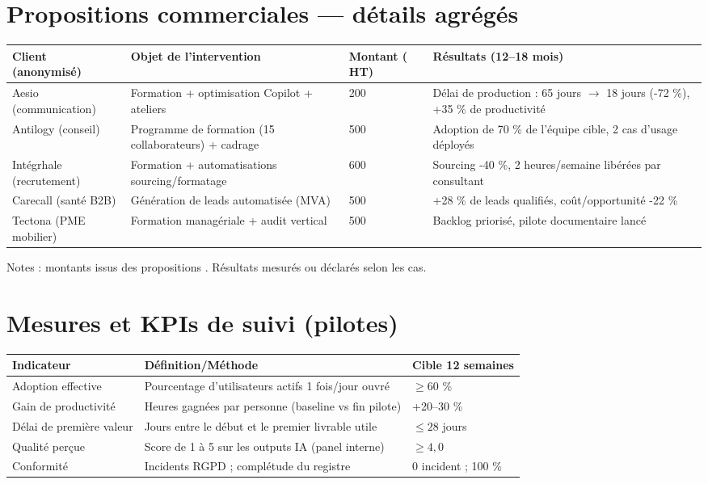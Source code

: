 \section{Propositions commerciales — détails agrégés}
\begin{longtable}{@{}>{\raggedright\arraybackslash}p{3.2cm}>{\raggedright\arraybackslash}p{5cm}>{\raggedright\arraybackslash}p{2.5cm}>{\raggedright\arraybackslash}p{4.5cm}@{}}
\toprule
\textbf{Client (anonymisé)} & \textbf{Objet de l’intervention} & \textbf{Montant (\texteuro{} HT)} & \textbf{Résultats (12–18 mois)} \\
\midrule
Aesio (communication) & Formation + optimisation Copilot + ateliers & 3 200 & Délai de production : 65 jours $\rightarrow$ 18 jours (-72 \%), +35 \% de productivité \\
Antilogy (conseil) & Programme de formation (15 collaborateurs) + cadrage & 3 500 & Adoption de 70 \% de l’équipe cible, 2 cas d’usage déployés \\
Intégrhale (recrutement) & Formation + automatisations sourcing/formatage & 2 600 & Sourcing -40 \%, 2 heures/semaine libérées par consultant \\
Carecall (santé B2B) & Génération de leads automatisée (MVA) & 2 500 & +28 \% de leads qualifiés, coût/opportunité -22 \% \\
Tectona (PME mobilier) & Formation managériale + audit vertical & 3 500 & Backlog priorisé, pilote documentaire lancé \\
\bottomrule
\end{longtable}
Notes : montants issus des propositions \cite{luwai2025aesio, luwai2025antilogy, luwai2025integrhale, luwai2025carecall, luwai2025tectona}. Résultats mesurés ou déclarés selon les cas.

\section{Mesures et KPIs de suivi (pilotes)}
\begin{longtable}{@{}p{5.5cm}p{7.5cm}p{4cm}@{}}
\toprule
\textbf{Indicateur} & \textbf{Définition/Méthode} & \textbf{Cible 12 semaines} \\
\midrule
Adoption effective & Pourcentage d’utilisateurs actifs 1 fois/jour ouvré & $\geq 60$ \% \\
Gain de productivité & Heures gagnées par personne (baseline vs fin pilote) & +20–30 \% \\
Délai de première valeur & Jours entre le début et le premier livrable utile & $\leq 28$ jours \\
Qualité perçue & Score de 1 à 5 sur les outputs IA (panel interne) & $\geq 4{,}0$ \\
Conformité & Incidents RGPD ; complétude du registre & 0 incident ; 100 \% \\
\bottomrule
\end{longtable}

